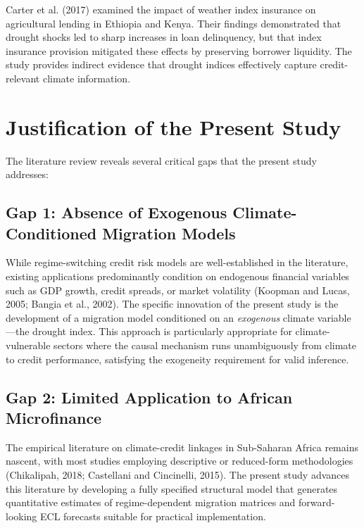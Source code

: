\documentclass[12pt,a4paper]{article}
\begin{document}
Carter et al. (2017) examined the impact of weather index insurance on agricultural lending in Ethiopia and Kenya. Their findings demonstrated that drought shocks led to sharp increases in loan delinquency, but that index insurance provision mitigated these effects by preserving borrower liquidity. The study provides indirect evidence that drought indices effectively capture credit-relevant climate information.

\section{Justification of the Present Study}

The literature review reveals several critical gaps that the present study addresses:

\subsection{Gap 1: Absence of Exogenous Climate-Conditioned Migration Models}

While regime-switching credit risk models are well-established in the literature, existing applications predominantly condition on endogenous financial variables such as GDP growth, credit spreads, or market volatility (Koopman and Lucas, 2005; Bangia et al., 2002). The specific innovation of the present study is the development of a migration model conditioned on an \textit{exogenous} climate variable---the drought index. This approach is particularly appropriate for climate-vulnerable sectors where the causal mechanism runs unambiguously from climate to credit performance, satisfying the exogeneity requirement for valid inference.

\subsection{Gap 2: Limited Application to African Microfinance}

The empirical literature on climate-credit linkages in Sub-Saharan Africa remains nascent, with most studies employing descriptive or reduced-form methodologies (Chikalipah, 2018; Castellani and Cincinelli, 2015). The present study advances this literature by developing a fully specified structural model that generates quantitative estimates of regime-dependent migration matrices and forward-looking ECL forecasts suitable for practical implementation.
\end{document}
